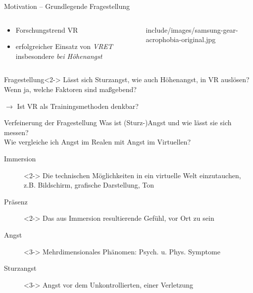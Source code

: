 \begin{frame}{Motivation -- Grundlegende Fragestellung}
\begin{columns}
	\begin{column}{0.48\textwidth}
		\begin{itemize}[label=\textcolor{tertiary}{\textbullet}]
			\item Forschungstrend \gls{VR}
			\item erfolgreicher Einsatz von \textit{\gls{VRET}} insbesondere \textit{bei Höhenangst} \autocite{Emmelkamp2001}
		\end{itemize}
	\end{column}
	\begin{column}{0.44\textwidth}
		\vfill
		\hfill
		\begin{overpic}[width=0.9\columnwidth]{include/images/samsung-gear-acrophobia-original.jpg}
		\end{overpic}
	\end{column}
\end{columns}
\vfill
{}
\begin{block}{Fragestellung}<2->
	Lässt sich \textcolor{tertiary}{Sturzangst}, wie auch Höhenangst, \textcolor{tertiary}{in \gls{VR} auslösen?}\\Wenn ja, welche Faktoren sind maßgebend?
	
	\hfill $\rightarrow$ Ist \gls{VR} als Trainingsmethoden denkbar?
\end{block}
\end{frame}

\begin{frame}{Verfeinerung der Fragestellung}
Was ist (Sturz-)Angst und wie lässt sie sich messen?\\Wie vergleiche ich Angst im Realen mit Angst im Virtuellen?
\begin{description}
\item[Immersion]<2-> Die technischen Möglichkeiten in ein virtuelle Welt einzutauchen,\\z.B. Bildschirm, grafische Darstellung, Ton \autocite{McMahan2003}
\item[Präsenz]<2-> Das aus Immersion resultierende Gefühl, vor Ort zu sein \autocite{McMahan2003}
\item[Angst]<3-> Mehrdimensionales Phänomen: Psych. u. Phys. Symptome \autocite{Krohne1996}
\item[Sturzangst]<3-> Angst vor dem Unkontrollierten, einer Verletzung \autocite{Lewis2010}
\end{description}
\begin{center}
\end{center}
\end{frame}

